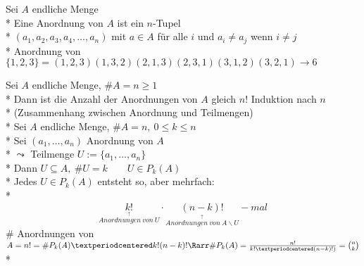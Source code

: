 Sei $A$ endliche Menge\\*
Eine Anordnung von $A$ ist ein $n$-Tupel\\*
$(a_1,a_2,a_3,a_4,…,a_n)$ mit $a\in A$ für alle $i$ und $a_i\neq a_j$ wenn $i\neq j$\\*
%
\bsp
Anordnung von $\{1,2,3\}=(1,2,3)(1,3,2)(2,1,3)(2,3,1)(3,1,2)(3,2,1)→6$

Sei $A$ endliche Menge, $\#A=n\geq 1$\\*
Dann ist die Anzahl der Anordnungen von $A$ gleich $n!$
\bew
Induktion nach $n$\\*
%
\bem
(Zusammenhang zwischen Anordnung und Teilmengen)\\*
Sei $A$ endliche Menge, $\#A=n,\ 0\leq k\leq n$\\*
Sei $(a_1,…,a_n)$ Anordnung von $A$\\*
$\leadsto$ Teilmenge $U:=\{a_1,…,a_n\}$\\*
Dann $U\subseteq A,\ \#U=k\qquad U\in P_k(A)$\\*
Jedes $U\in P_k(A)$ entsteht so, aber mehrfach:\\*
\[\underset{\overset{\uparrow}{Anordnungen\ von\ U}}{k!}·\underset{\overset{\uparrow}{Anordnungen\ von\ A\backslash U}}{(n-k)!}-mal\]
$\#$ Anordnungen von $A=n!=\#P_k(A)·k!(n-k)!\Rarr\#P_k(A)=\frac{n!}{k!·(n-k)!)}=\binom{n}{k}$\\*
%

